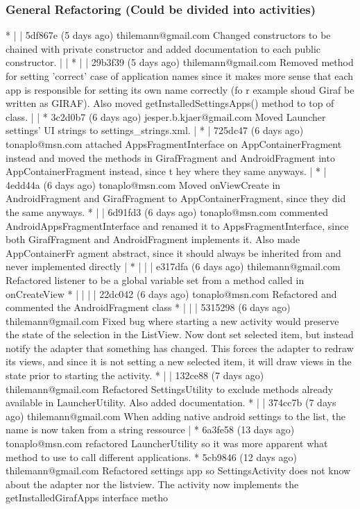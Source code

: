 \subsubsection{General Refactoring (Could be divided into activities)}
* | | 5df867e (5 days ago) thilemann@gmail.com Changed constructors to be chained with private constructor and added documentation to each public constructor.
| | * | | 29b3f39 (5 days ago) thilemann@gmail.com Removed method for setting 'correct' case of application names since it makes more sense that each app is responsible for setting its own name correctly (fo
r example shoud Giraf be written as GIRAF). Also moved getInstalledSettingsApps() method to top of class.
| | * 3c2d0b7 (6 days ago) jesper.b.kjaer@gmail.com Moved Launcher settings' UI strings to settings\_strings.xml.
| * | 725dc47 (6 days ago) tonaplo@msn.com attached AppsFragmentInterface on AppContainerFragment instead and moved the methods in GirafFragment and AndroidFragment into AppContainerFragment instead, since t
hey where they same anyways.
| * | 4edd44a (6 days ago) tonaplo@msn.com Moved onViewCreate in AndroidFragment and GirafFragment to AppContainerFragment, since they did the same anyways.
* | | 6d91fd3 (6 days ago) tonaplo@msn.com commented AndroidAppsFragmentInterface and renamed it to AppsFragmentInterface, since both GirafFragment and AndroidFragment implements it. Also made AppContainerFr
agment abstract, since it should always be inherited from and never implemented directly
| * | | | e317dfa (6 days ago) thilemann@gmail.com Refactored listener to be a global variable set from a method called in onCreateView
* | | | | 22dc042 (6 days ago) tonaplo@msn.com Refactored and commented the AndroidFragment class
* | | | 5315298 (6 days ago) thilemann@gmail.com Fixed bug where starting a new activity would preserve the state of the selection in the ListView. Now dont set selected item, but instead notify the adapter
that something has changed. This forces the adapter to redraw its views, and since it is not setting a new selected item, it will draw views in the state prior to starting the activity.
* | | 132ce88 (7 days ago) thilemann@gmail.com Refactored SettingsUtility to exclude methods already available in LauncherUtility. Also added documentation.
* | | 374cc7b (7 days ago) thilemann@gmail.com When adding native android settings to the list, the name is now taken from a string ressource
| * 6a3fe58 (13 days ago) tonaplo@msn.com refactored LauncherUtility so it was more apparent what method to use to call different applications.
* 5cb9846 (12 days ago) thilemann@gmail.com Refactored settings app so SettingsActivity does not know about the adapter nor the listview. The activity now implements the getInstalledGirafApps interface metho

